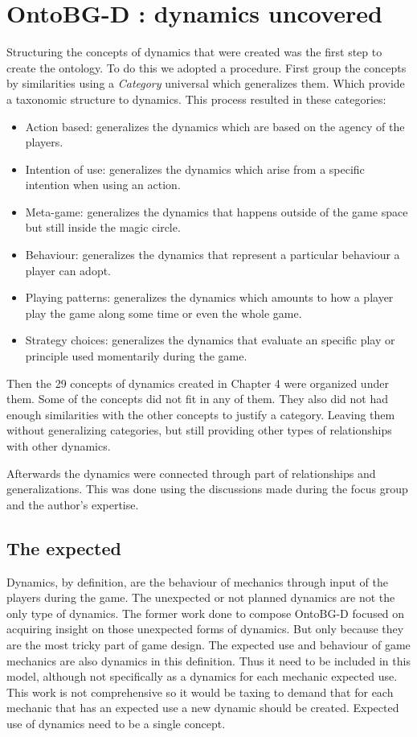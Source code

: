 \section{OntoBG-D : dynamics uncovered}

Structuring the concepts of dynamics that were created was the first step to create the ontology. To do this we adopted a procedure. First group the concepts by similarities using a \textit{Category} universal which generalizes them. Which provide a taxonomic structure to dynamics. This process resulted in these categories:
\begin{itemize}
    \item Action based: generalizes the dynamics which are based on the agency of the players.
    \item Intention of use: generalizes the dynamics which arise from a specific intention when using an action.
    \item Meta-game: generalizes the dynamics that happens outside of the game space but still inside the magic circle.
    \item Behaviour: generalizes the dynamics that represent a particular behaviour a player can adopt.
    \item Playing patterns: generalizes the dynamics which amounts to how a player play the game along some time or even the whole game.
    \item Strategy choices: generalizes the dynamics that evaluate an specific play or principle used momentarily during the game.
\end{itemize}

Then the 29 concepts of dynamics created in Chapter 4 were organized under them. Some of the concepts did not fit in any of them. They also did not had enough similarities with the other concepts to justify a category. Leaving them without generalizing categories, but still providing other types of relationships with other dynamics.

Afterwards the dynamics were connected through part of relationships and generalizations. This was done using the discussions made during the focus group and the author's expertise. 

\subsection{The expected}

Dynamics, by definition, are the behaviour of mechanics through input of the players during the game. The unexpected or not planned dynamics are not the only type of dynamics. The former work done to compose OntoBG-D focused on acquiring insight on those unexpected forms of dynamics. But only because they are the most tricky part of game design. The expected use and behaviour of game mechanics are also dynamics in this definition. Thus it need to be included in this model, although not specifically as a dynamics for each mechanic expected use. This work is not comprehensive so it would be taxing to demand that for each mechanic that has an expected use a new dynamic should be created. Expected use of dynamics need to be a single concept.

